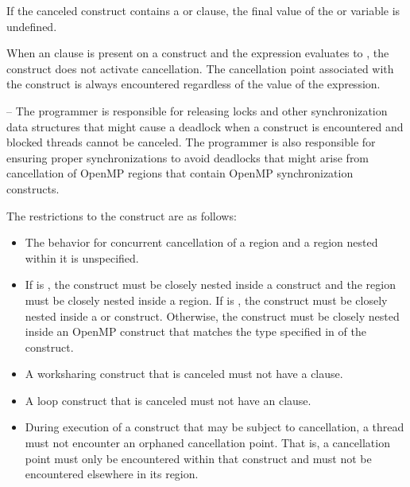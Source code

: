 {{{{If the canceled construct contains a  or  clause, the final 
value of the  or  variable is undefined.

When an  clause is present on a  construct and the  expression evaluates 
to , the  construct does not activate cancellation. The cancellation point 
associated with the  construct is always encountered regardless of the value of 
the  expression.

\notestart
\noteheader – The programmer is responsible for releasing locks and
other synchronization data structures that might cause a deadlock when
a  construct is encountered and blocked threads cannot be
canceled. The programmer is also responsible for ensuring proper
synchronizations to avoid deadlocks that might arise from cancellation
of OpenMP regions that contain OpenMP synchronization constructs.
\noteend

\restrictions
The restrictions to the  construct are as follows:

\begin{itemize}
\item The behavior for concurrent cancellation of a region and a region nested within it is 
unspecified.

\item If  is , the 
construct must be closely nested inside a  construct and the
 region must be closely nested inside a  region. If
 is , the  construct
must be closely nested inside a  or  construct.
Otherwise, the  construct must be closely
nested inside an OpenMP construct that matches the type specified in
 of the  construct.

\item A worksharing construct that is canceled must not have a  clause.

\item A loop construct that is canceled must not have an  clause.

\item During execution of a construct that may be subject to cancellation, a
thread must not encounter an orphaned cancellation point. That is, a
cancellation point must only be encountered within that construct and must
not be encountered elsewhere in its region.
\end{itemize}

}}}}
